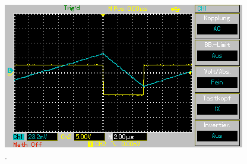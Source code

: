 \begin{figure}[H]
\begin{minipage}{0.48\textwidth}
        \vspace{1em}
        \includegraphics[width=\textwidth]{content/Grafiken/MAP004.png}
    \end{minipage}
    \caption{.}
\end{figure}
\noindent
